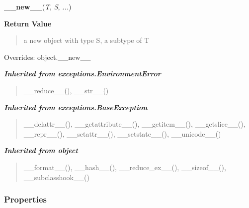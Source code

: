     \vspace{0.5ex}

\hspace{.8\funcindent}\begin{boxedminipage}{\funcwidth}

    \raggedright \textbf{\_\_new\_\_}(\textit{T}, \textit{S}, \textit{...})

\setlength{\parskip}{2ex}
\setlength{\parskip}{1ex}
      \textbf{Return Value}
    \vspace{-1ex}

      \begin{quote}
      a new object with type S, a subtype of T

      \end{quote}

      Overrides: object.\_\_new\_\_

    \end{boxedminipage}


\large{\textbf{\textit{Inherited from exceptions.EnvironmentError}}}

\begin{quote}
\_\_reduce\_\_(), \_\_str\_\_()
\end{quote}

\large{\textbf{\textit{Inherited from exceptions.BaseException}}}

\begin{quote}
\_\_delattr\_\_(), \_\_getattribute\_\_(), \_\_getitem\_\_(), \_\_getslice\_\_(), \_\_repr\_\_(), \_\_setattr\_\_(), \_\_setstate\_\_(), \_\_unicode\_\_()
\end{quote}

\large{\textbf{\textit{Inherited from object}}}

\begin{quote}
\_\_format\_\_(), \_\_hash\_\_(), \_\_reduce\_ex\_\_(), \_\_sizeof\_\_(), \_\_subclasshook\_\_()
\end{quote}


  \subsubsection{Properties}

